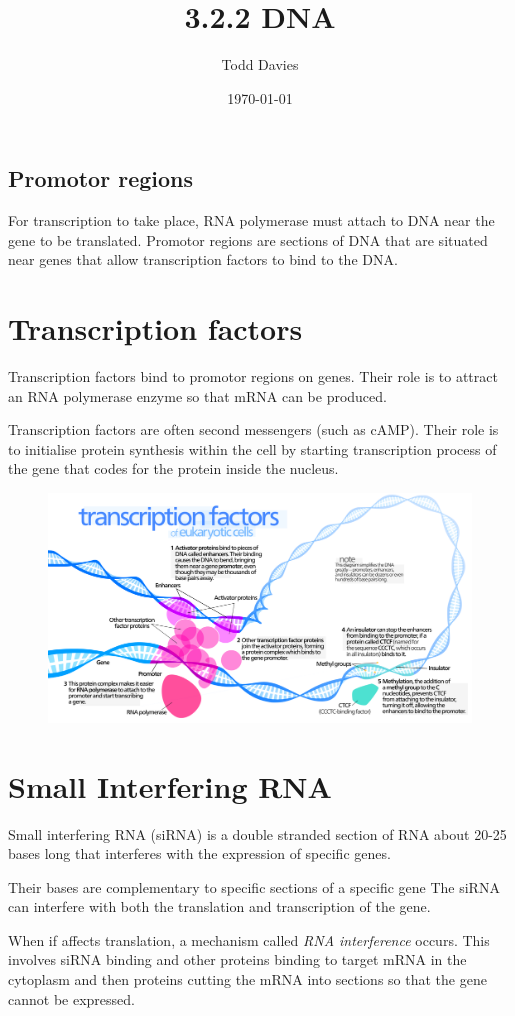 \documentclass{article}
\author{Todd Davies}
\title{3.2.2 DNA}
\date{\today}
\begin{document}
\lhead{\today}

\maketitle

\subsection*{Promotor regions}
\thispagestyle{empty}

For transcription to take place, RNA polymerase must attach to DNA near the gene
to be translated. Promotor regions are sections of DNA that are situated near
genes that allow transcription factors to bind to the DNA.

\section*{Transcription factors}

Transcription factors bind to promotor regions on genes. Their role is to
attract an RNA polymerase enzyme so that mRNA can be produced.

Transcription factors are often second messengers (such as cAMP). Their role is
to initialise protein synthesis within the cell by starting transcription
process of the gene that codes for the protein inside the nucleus.

\begin{figure}
	\centering
	\includegraphics[scale=0.3, angle=90]{transcriptionfactors}
\end{figure}

\newpage

\section*{Small Interfering RNA}

Small interfering RNA (siRNA) is a double stranded section of RNA about 20-25
bases long that interferes with the expression of specific genes.

Their bases are complementary to specific sections of a specific gene The siRNA
can interfere with both the translation and transcription of the gene.

When if affects translation, a mechanism called {\it RNA interference} occurs.
This involves siRNA binding and other proteins binding to target mRNA in the
cytoplasm and then proteins cutting the mRNA into sections so that the gene
cannot be expressed.
\end{document}
